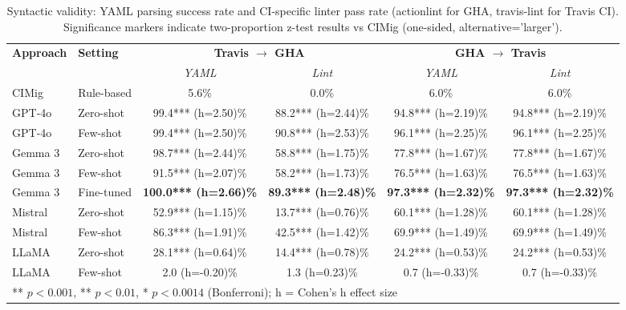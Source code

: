 \begin{table}[t]
\centering
\caption{Syntactic validity: YAML parsing success rate and CI-specific linter pass rate (actionlint for GHA, travis-lint for Travis CI). Significance markers indicate two-proportion z-test results vs CIMig (one-sided, alternative='larger').}
\label{tab:linting-results}
\begin{tabular}{llcccc}
\toprule
\textbf{Approach} & \textbf{Setting} &
\multicolumn{2}{c}{\textbf{Travis $\rightarrow$ GHA}} &
\multicolumn{2}{c}{\textbf{GHA $\rightarrow$ Travis}} \\
\cmidrule(lr){3-4} \cmidrule(lr){5-6}
& & \textit{YAML} & \textit{Lint} & \textit{YAML} & \textit{Lint} \\
\midrule
CIMig & Rule-based & 5.6\% & 0.0\% & 6.0\% & 6.0\% \\
\midrule
GPT-4o & Zero-shot & 99.4*** (h=2.50)\% & 88.2*** (h=2.44)\% & 94.8*** (h=2.19)\% & 94.8*** (h=2.19)\% \\
GPT-4o & Few-shot & 99.4*** (h=2.50)\% & 90.8*** (h=2.53)\% & 96.1*** (h=2.25)\% & 96.1*** (h=2.25)\% \\
\midrule
Gemma 3 & Zero-shot & 98.7*** (h=2.44)\% & 58.8*** (h=1.75)\% & 77.8*** (h=1.67)\% & 77.8*** (h=1.67)\% \\
Gemma 3 & Few-shot & 91.5*** (h=2.07)\% & 58.2*** (h=1.73)\% & 76.5*** (h=1.63)\% & 76.5*** (h=1.63)\% \\
Gemma 3 & Fine-tuned & \textbf{100.0*** (h=2.66)\%} & \textbf{89.3*** (h=2.48)\%} & \textbf{97.3*** (h=2.32)\%} & \textbf{97.3*** (h=2.32)\%} \\
\midrule
Mistral & Zero-shot & 52.9*** (h=1.15)\% & 13.7*** (h=0.76)\% & 60.1*** (h=1.28)\% & 60.1*** (h=1.28)\% \\
Mistral & Few-shot & 86.3*** (h=1.91)\% & 42.5*** (h=1.42)\% & 69.9*** (h=1.49)\% & 69.9*** (h=1.49)\% \\
\midrule
LLaMA & Zero-shot & 28.1*** (h=0.64)\% & 14.4*** (h=0.78)\% & 24.2*** (h=0.53)\% & 24.2*** (h=0.53)\% \\
LLaMA & Few-shot & 2.0 (h=-0.20)\% & 1.3 (h=0.23)\% & 0.7 (h=-0.33)\% & 0.7 (h=-0.33)\% \\
\bottomrule
\multicolumn{6}{l}{\footnotesize *** $p < 0.001$, ** $p < 0.01$, * $p < 0.0014$ (Bonferroni); h = Cohen's h effect size} \\
\end{tabular}
\end{table}
